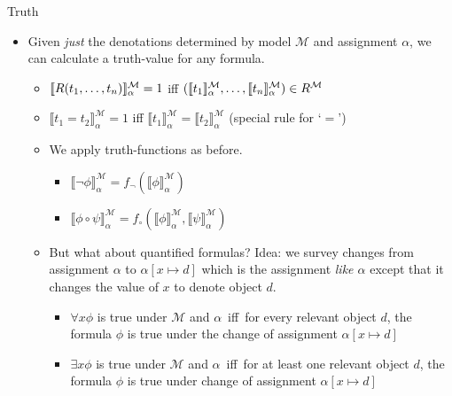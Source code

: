 \begin{frame}{Truth}

  \small
	\begin{itemize}%
	\itemsep=8pt
		
		\item Given \emph{just} the denotations determined by model $\mathcal{M}$ and assignment $\alpha$, we can calculate a truth-value for any formula.
		
		\medskip
		
		\begin{itemize}
		\itemsep=10pt
		
			 \item { $\llbracket R(t_1, \mathellipsis, t_n)\rrbracket^\mathcal{M}_\alpha=1$ iff $(\llbracket t_1\rrbracket^\mathcal{M}_\alpha, \mathellipsis, \llbracket t_n\rrbracket^\mathcal{M}_\alpha)\in R^\mathcal{M}$}
				
			\item {$\llbracket t_1=t_2\rrbracket^\mathcal{M}_\alpha=1$  iff $\llbracket t_1\rrbracket^\mathcal{M}_\alpha=\llbracket t_2\rrbracket^\mathcal{M}_\alpha$ \quad \alert{(special rule for `$=$')}}
			
			\item We apply truth-functions as before.
				\begin{itemize}
			
				\item $\llbracket \neg\phi\rrbracket^\mathcal{M}_\alpha=f_\neg(\llbracket\phi\rrbracket^\mathcal{M}_\alpha)$	
			
				\item $\llbracket\phi\circ\psi\rrbracket^\mathcal{M}_\alpha=f_\circ(\llbracket\phi\rrbracket^\mathcal{M}_\alpha,\llbracket\psi\rrbracket^\mathcal{M}_\alpha)$
			
				\end{itemize}
					
			\item But what about quantified formulas? Idea: we survey changes from assignment $\alpha$ to $\alpha[x\mapsto d]$ which is the assignment \emph{like $\alpha$} except that it changes the value of $x$ to denote object $d$.

				\begin{itemize}
				
				\item $\forall x\phi$ is true under $\mathcal{M}$ and $\alpha$ \,iff\, for every relevant object $d$, the formula $\phi$ is true under the change of assignment $\alpha[x\mapsto d]$ 
				\item $\exists x\phi$ is true under $\mathcal{M}$ and $\alpha$ \,iff\, for at least one relevant object $d$, the formula $\phi$ is true under change of assignment $\alpha[x\mapsto d]$ 
		
				\end{itemize}
				
		\end{itemize}
		
	\end{itemize}

\end{frame}

